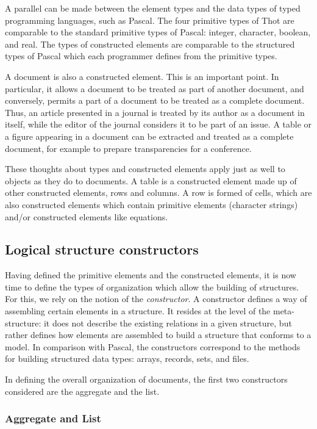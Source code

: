 A parallel can be made between the element types and the data types of
typed programming languages, such as Pascal.  The four primitive types
of Thot are comparable to the standard primitive types of Pascal:
integer, character, boolean, and real.  The types of constructed
elements are comparable to the structured types of Pascal which each
programmer defines from the primitive types.

A document is also a constructed element.  This is an important point.
In particular, it allows a document to be treated as part of another
document, and conversely, permits a part of a document to be treated
as a complete document.  Thus, an article presented in a journal is
treated by its author as a document in itself, while the editor of the
journal considers it to be part of an issue.  A table or a figure
appearing in a document can be extracted and treated as a complete
document, for example to prepare transparencies for a conference.

These thoughts about types and constructed elements apply just as well
to objects as they do to documents.  A table is a constructed element
made up of other constructed elements, rows and columns.  A row is
formed of cells, which are also constructed elements which contain
primitive elements (character strings) and/or constructed elements
like equations.

\subsection{Logical structure constructors}

Having defined the primitive elements and the constructed elements, it
is now time to define the types of organization which allow the
building of structures.  For this, we rely on the notion of the {\em
constructor}.  A constructor defines a way of assembling certain
elements in a structure.  It resides at the level of the
meta-structure: it does not describe the existing relations in a given
structure, but rather defines  how elements are assembled to build a
structure that conforms to a model.  In comparison with Pascal, the
constructors correspond to the methods for building structured data
types: arrays, records, sets, and files.

In defining the overall organization of documents, the first two
constructors considered are the aggregate and the list.

\subsubsection{Aggregate and List}

